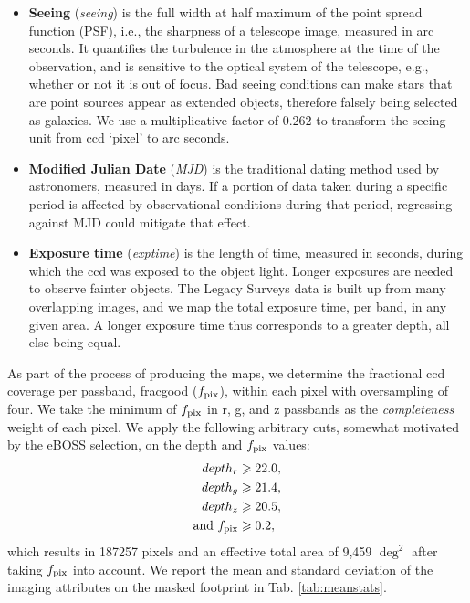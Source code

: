 \documentclass[fleqn, usenatbib]{mnras}
\begin{document}
\begin{itemize}
  {\bf Sky brightness} (\textit{skymag}) relates to the background level that is estimated and subtracted from the images as part of the photometric processing. It thus alters the depth of the imaging. It is measured in AB mag/arcsec$^{2}$. \\


    \item {\bf Seeing} (\textit{seeing}) is the full width at half maximum of the point spread function (PSF), i.e., the sharpness of a telescope image, measured in arc seconds. It quantifies the turbulence in the atmosphere at the time of the observation, and is sensitive to the optical system of the telescope, e.g., whether or not it is out of focus. Bad seeing conditions can make stars that are point sources appear as extended objects, therefore falsely being selected as galaxies. We use a multiplicative factor of 0.262 to transform the seeing unit from ccd `pixel' to arc seconds.\\

    \item {\bf Modified Julian Date} (\textit{MJD}) is the traditional dating method used by astronomers, measured in days. If a portion of data taken during a specific period is affected by observational conditions during that period, regressing against MJD could mitigate that effect.\\

    \item {\bf Exposure time} (\textit{exptime}) is the length of time, measured in seconds, during which the ccd was exposed to the object light. Longer exposures are needed to observe fainter objects. The Legacy Surveys data is built up from many overlapping images, and we map the total exposure time, per band, in any given area. A longer exposure time thus corresponds to a greater depth, all else being equal.
\end{itemize}

As part of the process of producing the maps, we determine the fractional ccd coverage per passband, fracgood ($f_{{\rm pix}}$), within each pixel with oversampling of four. We take the minimum of $f_{{\rm pix}}$ in r, g, and z passbands as the \textit{completeness} weight of each pixel. We apply the following arbitrary cuts, somewhat motivated by the eBOSS selection, on the depth and $f_{{\rm pix}}$ values: \\
\begin{align}\label{eq:depth_cuts}
depth_{r} &\geq 22.0, \\
depth_{g} &\geq 21.4, \nonumber\\
depth_{z} &\geq 20.5, \nonumber\\
{\rm and}~f_{\rm pix}  &\geq 0.2, \nonumber
\end{align}
which results in 187257 pixels and an effective total area of 9,459 $\deg^2$ after taking $f_{{\rm pix}}$ into account. We report the mean and standard deviation of the imaging attributes on the masked footprint in Tab. \ref{tab:meanstats}.\\
\end{document}
